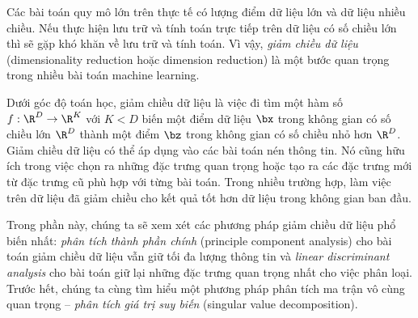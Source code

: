 Các bài toán quy mô lớn trên thực tế có lượng điểm dữ liệu lớn và dữ liệu nhiều
chiều. Nếu thực hiện lưu trữ và tính toán trực tiếp trên dữ liệu có số chiều lớn
thì sẽ gặp khó khăn về lưu trữ và tính toán. Vì vậy, \textit{giảm
chiều dữ liệu} ({dimensionality reduction} hoặc {dimension reduction}) là một
bước quan trọng trong nhiều bài toán machine learning.


Dưới góc độ toán học, giảm chiều dữ liệu là việc đi tìm một hàm số $f: \R^D
\rightarrow \R^K$ với $K < D$ biến một điểm dữ liệu $\bx$ trong không gian có số
chiều lớn $\R^D$ thành một điểm $\bz$ trong không gian có số chiều nhỏ hơn
$\R^D$. Giảm chiều dữ liệu có thể áp dụng vào các bài toán nén thông tin. Nó cũng hữu ích trong việc chọn ra những đặc trưng quan trọng hoặc
tạo ra các đặc trưng mới từ đặc trưng cũ phù hợp với từng bài toán. Trong nhiều trường hợp, làm việc trên dữ liệu đã giảm chiều cho kết quả tốt
hơn dữ liệu trong không gian ban đầu. 

Trong phần này, chúng ta sẽ xem xét các phương pháp giảm chiều dữ liệu phổ biến
nhất: \textit{phân tích thành phần chính} ({principle component analysis}) cho bài toán giảm chiều dữ liệu
vẫn giữ tối đa lượng thông tin và \textit{linear discriminant analysis}
cho bài toán giữ lại những đặc trưng quan trọng nhất cho việc phân loại. Trước
hết, chúng ta cùng tìm hiểu một phương pháp phân tích ma trận vô
cùng quan trọng  --  \textit{phân tích giá trị suy biến} ({singular value decomposition}). 